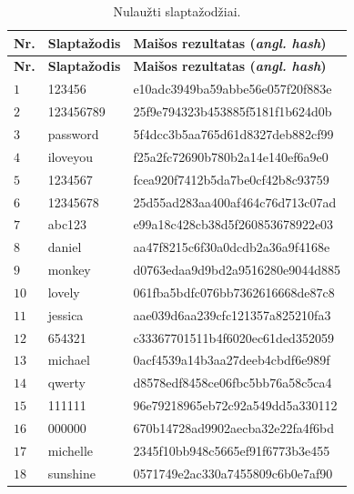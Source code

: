 \begin{longtable}{|l|l|l|}
    \caption{Nulaužti slaptažodžiai.}
    \label{tab:nulaužti_slaptažodžiai} \\
    \hline
    \textbf{Nr.} & \textbf{Slaptažodis} &
    \textbf{Maišos rezultatas (\textit{angl. hash})} \\
    \hline
    \endfirsthead

    \hline
    \textbf{Nr.} & \textbf{Slaptažodis} &
    \textbf{Maišos rezultatas (\textit{angl. hash})} \\
    \hline
    \endhead

    \hline
    \endfoot

    \hline
    \endlastfoot

    $1$ & 123456 & e10adc3949ba59abbe56e057f20f883e \\ \hline
    $2$ & 123456789 & 25f9e794323b453885f5181f1b624d0b \\ \hline
    $3$ & password & 5f4dcc3b5aa765d61d8327deb882cf99 \\ \hline
    $4$ & iloveyou & f25a2fc72690b780b2a14e140ef6a9e0 \\ \hline
    $5$ & 1234567 & fcea920f7412b5da7be0cf42b8c93759 \\ \hline
    $6$ & 12345678 & 25d55ad283aa400af464c76d713c07ad \\ \hline
    $7$ & abc123 & e99a18c428cb38d5f260853678922e03 \\ \hline
    $8$ & daniel & aa47f8215c6f30a0dcdb2a36a9f4168e \\ \hline
    $9$ & monkey & d0763edaa9d9bd2a9516280e9044d885 \\ \hline
    $10$ & lovely & 061fba5bdfc076bb7362616668de87c8 \\ \hline
    $11$ & jessica & aae039d6aa239cfc121357a825210fa3 \\ \hline
    $12$ & 654321 & c33367701511b4f6020ec61ded352059 \\ \hline
    $13$ & michael & 0acf4539a14b3aa27deeb4cbdf6e989f \\ \hline
    $14$ & qwerty & d8578edf8458ce06fbc5bb76a58c5ca4 \\ \hline
    $15$ & 111111 & 96e79218965eb72c92a549dd5a330112 \\ \hline
    $16$ & 000000 & 670b14728ad9902aecba32e22fa4f6bd \\ \hline
    $17$ & michelle & 2345f10bb948c5665ef91f6773b3e455 \\ \hline
    $18$ & sunshine & 0571749e2ac330a7455809c6b0e7af90 \\ \hline

\end{longtable}
